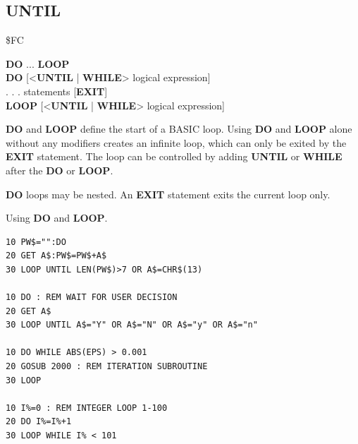 \subsection{UNTIL}
\begin{description}[leftmargin=2cm,style=nextline]
\item [Token:] \$FC
\item [Format:] {\bf DO} ... {\bf LOOP} \\
                {\bf DO} [<{\bf UNTIL} | {\bf WHILE}> logical expression] \\
                . . . statements [{\bf EXIT}] \\
                {\bf LOOP} [<{\bf UNTIL} | {\bf WHILE}> logical expression]
\item [Usage:] {\bf DO} and {\bf LOOP} define
                the start of a BASIC loop.
                Using {\bf DO} and {\bf LOOP} alone without any
                modifiers creates an infinite loop, which can only be exited
                by the {\bf EXIT} statement. The loop can be
                controlled by adding {\bf UNTIL} or {\bf WHILE}
                after the {\bf DO} or {\bf LOOP}.

\item [Remarks:] {\bf DO} loops may be nested. An {\bf EXIT} statement
               exits the current loop only.
\item [Examples:] Using {\bf DO} and {\bf LOOP}.
\begin{tcolorbox}[colback=black,coltext=white]
\verbatimfont{\codefont}
\begin{verbatim}
10 PW$="":DO
20 GET A$:PW$=PW$+A$
30 LOOP UNTIL LEN(PW$)>7 OR A$=CHR$(13)

10 DO : REM WAIT FOR USER DECISION
20 GET A$
30 LOOP UNTIL A$="Y" OR A$="N" OR A$="y" OR A$="n"

10 DO WHILE ABS(EPS) > 0.001
20 GOSUB 2000 : REM ITERATION SUBROUTINE
30 LOOP

10 I%=0 : REM INTEGER LOOP 1-100
20 DO I%=I%+1
30 LOOP WHILE I% < 101
\end{verbatim}
\end{tcolorbox}
\end{description}


\newpage
